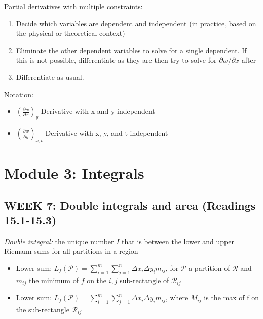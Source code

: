 \documentclass[12pt]{article}
\begin{document}
Partial derivatives with multiple constraints:
\begin{enumerate}
    \item Decide which variables are dependent and independent (in practice, based on the physical or theoretical context)
    \item Eliminate the other dependent variables to solve for a single dependent. If this is not possible, differentiate as they are then try to solve for $\partial w / \partial x$ after
    \item Differentiate as usual. 
\end{enumerate}

Notation:
\begin{itemize}
    \item $\left(\frac{\partial w}{\partial x}\right)_y$ Derivative with x and y independent
    \item $\left(\frac{\partial w}{\partial y}\right)_{x, t}$ Derivative with x, y, and t independent
\end{itemize}
\pagebreak
\section{Module 3: Integrals}
\subsection{WEEK 7: Double integrals and area (Readings 15.1-15.3)}
\emph{Double integral:} the unique number $I$ that is between the lower and upper Riemann sums for all partitions in a region
\begin{itemize}
    \item Lower sum: $L_f(\mathcal{P}) = \sum \limits_{i=1}^m \sum \limits_{j = 1}^n \Delta x_i \Delta y_i m_{ij}$, for $\mathcal{P}$ a partition of $\mathcal{R}$ and $m_{ij}$ the minimum of $f$ on the $i, j$ sub-rectangle of $\mathcal{R}_{ij}$
    \item Lower sum: $L_f(\mathcal{P}) = \sum\limits_{i=1}^m \sum\limits_{j = 1}^n \Delta x_i \Delta y_i m_{ij}$, where $M_{ij}$ is the max of f on the sub-rectangle $\mathcal{R}_{ij}$\\
\end{itemize}
\end{document}
